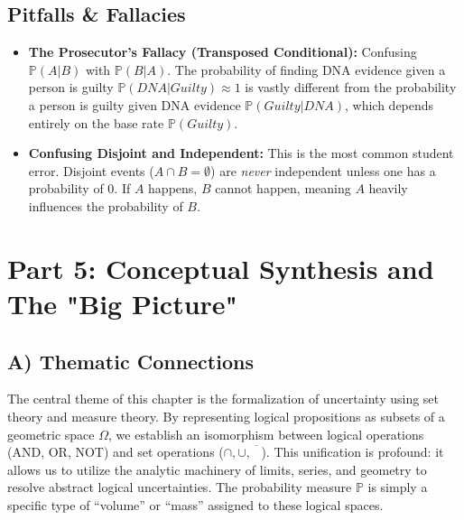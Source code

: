 \documentclass[11pt]{article}
\theoremstyle{definition}
\theoremstyle{remark}
\newcommand{\Prob}{\mathbb{P}}
\begin{document}
\subsection{Pitfalls \& Fallacies}
\begin{itemize}
    \item \textbf{The Prosecutor's Fallacy (Transposed Conditional):} Confusing $\Prob(A|B)$ with $\Prob(B|A)$. The probability of finding DNA evidence given a person is guilty $\Prob(DNA | Guilty) \approx 1$ is vastly different from the probability a person is guilty given DNA evidence $\Prob(Guilty | DNA)$, which depends entirely on the base rate $\Prob(Guilty)$.
    \item \textbf{Confusing Disjoint and Independent:} This is the most common student error. Disjoint events ($A \cap B = \emptyset$) are \textit{never} independent unless one has a probability of 0. If $A$ happens, $B$ cannot happen, meaning $A$ heavily influences the probability of $B$.
\end{itemize}

\newpage
\section{Part 5: Conceptual Synthesis and The "Big Picture"}

\subsection{A) Thematic Connections}
The central theme of this chapter is the formalization of uncertainty using set theory and measure theory. By representing logical propositions as subsets of a geometric space $\Omega$, we establish an isomorphism between logical operations (AND, OR, NOT) and set operations ($\cap, \cup, \overline{\phantom{A}}$). This unification is profound: it allows us to utilize the analytic machinery of limits, series, and geometry to resolve abstract logical uncertainties. The probability measure $\Prob$ is simply a specific type of ``volume'' or ``mass'' assigned to these logical spaces.
\end{document}
